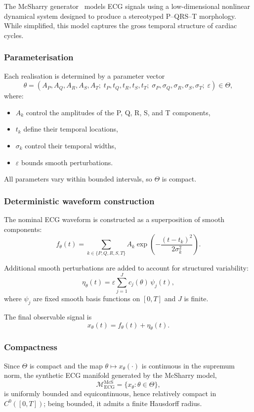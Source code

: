 \documentclass[10pt]{article}
\theoremstyle{plain}
\theoremstyle{definition}
\theoremstyle{remark}
\begin{document}
The McSharry generator~\citep{mcsharry2003dynamical} models ECG signals using a
low-dimensional nonlinear dynamical system designed to produce a stereotyped
P--QRS--T morphology. While simplified, this model captures the gross temporal
structure of cardiac cycles.

\subsubsection{Parameterisation}

Each realisation is determined by a parameter vector
\[
\theta = (A_P, A_Q, A_R, A_S, A_T;\;
          t_P, t_Q, t_R, t_S, t_T;\;
          \sigma_P, \sigma_Q, \sigma_R, \sigma_S, \sigma_T;\;
          \varepsilon)
\in \Theta,
\]
where:
\begin{itemize}
    \item $A_k$ control the amplitudes of the P, Q, R, S, and T components,
    \item $t_k$ define their temporal locations,
    \item $\sigma_k$ control their temporal widths,
    \item $\varepsilon$ bounds smooth perturbations.
\end{itemize}
All parameters vary within bounded intervals, so $\Theta$ is compact.

\subsubsection{Deterministic waveform construction}

The nominal ECG waveform is constructed as a superposition of smooth
components:
\[
f_\theta(t) = \sum_{k \in \{P,Q,R,S,T\}}
A_k \exp\!\left( -\frac{(t - t_k)^2}{2\sigma_k^2} \right).
\]

Additional smooth perturbations are added to account for structured variability:
\[
\eta_\theta(t)
= \varepsilon \sum_{j=1}^{J} c_j(\theta)\,\psi_j(t),
\]
where $\psi_j$ are fixed smooth basis functions on $[0,T]$ and $J$ is finite.

The final observable signal is
\[
x_\theta(t) = f_\theta(t) + \eta_\theta(t).
\]

\subsubsection{Compactness}

Since $\Theta$ is compact and the map
$\theta \mapsto x_\theta(\cdot)$ is continuous in the supremum norm, the
synthetic ECG manifold generated by the McSharry model,
\[
\mathcal{M}_{\mathrm{ECG}}^{\mathrm{McS}}
= \{ x_\theta : \theta \in \Theta \},
\]
is uniformly bounded and equicontinuous, hence relatively compact in
$C^0([0,T])$; being bounded, it admits a finite Hausdorff radius.
\end{document}
